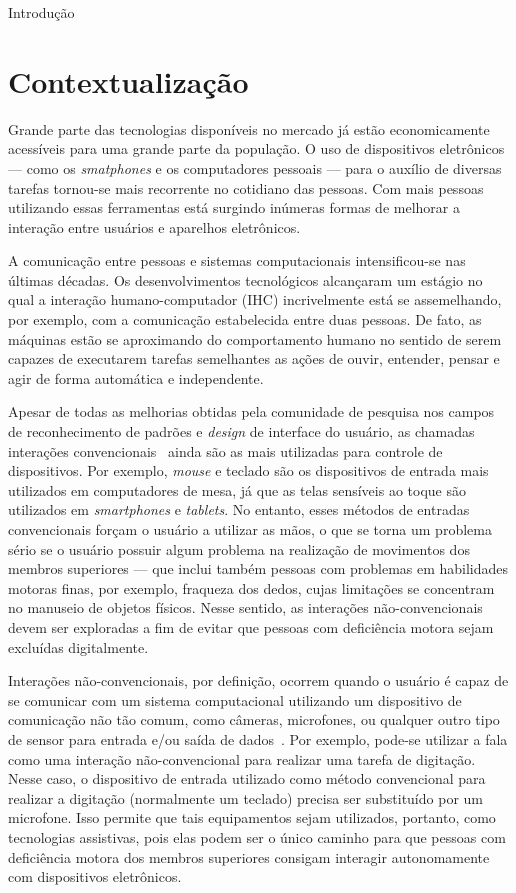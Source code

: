 \begin{chapter}{Introdução}

\section{Contextualização}
Grande parte das tecnologias disponíveis no mercado já estão economicamente
acessíveis para uma grande parte da população. O uso de dispositivos eletrônicos
--- como os \textit{smatphones} e os computadores pessoais --- para o auxílio de
diversas tarefas tornou-se mais recorrente no cotidiano das pessoas. Com mais
pessoas utilizando essas ferramentas está surgindo inúmeras formas de melhorar a
interação entre usuários e aparelhos eletrônicos.

A comunicação entre pessoas e sistemas computacionais intensificou-se nas 
últimas décadas. Os desenvolvimentos tecnológicos alcançaram um estágio no qual
a interação humano-computador (IHC) incrivelmente está se assemelhando, por
exemplo, com a comunicação estabelecida entre duas pessoas. De fato, as máquinas
estão se aproximando do comportamento humano no sentido de serem capazes de
executarem tarefas semelhantes as ações de ouvir, entender, pensar e agir de
forma automática e independente. 

Apesar de todas as melhorias obtidas pela comunidade de pesquisa nos campos de
reconhecimento de padrões e \textit{design} de interface do usuário, as chamadas
interações convencionais~\cite{Preece15} ainda são as mais utilizadas para
controle de dispositivos. Por exemplo, \textit{mouse} e teclado são os
dispositivos de entrada mais utilizados em computadores de mesa, já que as telas
sensíveis ao toque são utilizados em \textit{smartphones} e \textit{tablets}. No
entanto, esses métodos de entradas convencionais forçam o usuário a utilizar as
mãos, o que se torna um problema sério se o usuário possuir algum problema na
realização de movimentos dos membros superiores --- que inclui também pessoas
com problemas em habilidades motoras finas, por exemplo, fraqueza dos dedos,
cujas limitações se concentram no manuseio de objetos físicos. Nesse sentido, as
interações não-convencionais devem ser exploradas a fim de evitar que pessoas
com deficiência motora sejam excluídas digitalmente. 

Interações não-convencionais, por definição, ocorrem quando o usuário é capaz de
se comunicar com um sistema computacional utilizando um dispositivo de
comunicação não tão comum, como câmeras, microfones, ou qualquer outro tipo de
sensor para entrada e/ou saída de dados~\cite{Machado10}. Por exemplo, pode-se
utilizar a fala como uma interação não-convencional para realizar uma tarefa de
digitação. Nesse caso, o dispositivo de entrada utilizado como método
convencional para realizar a digitação (normalmente um teclado) precisa ser
substituído por um microfone. Isso permite que tais equipamentos sejam
utilizados, portanto, como tecnologias assistivas, pois elas podem ser o único
caminho para que pessoas com deficiência motora dos membros superiores consigam
interagir autonomamente com dispositivos eletrônicos.


\end{chapter}
